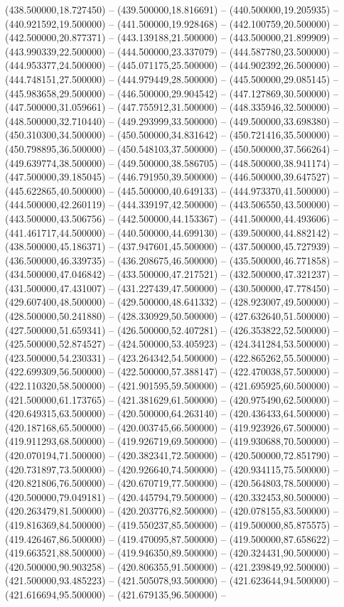 (438.500000,18.727450) -- (439.500000,18.816691) -- (440.500000,19.205935) -- (440.921592,19.500000) -- (441.500000,19.928468) -- (442.100759,20.500000) -- (442.500000,20.877371) -- (443.139188,21.500000) -- (443.500000,21.899909) -- (443.990339,22.500000) -- (444.500000,23.337079) -- (444.587780,23.500000) -- (444.953377,24.500000) -- (445.071175,25.500000) -- (444.902392,26.500000) -- (444.748151,27.500000) -- (444.979449,28.500000) -- (445.500000,29.085145) -- (445.983658,29.500000) -- (446.500000,29.904542) -- (447.127869,30.500000) -- (447.500000,31.059661) -- (447.755912,31.500000) -- (448.335946,32.500000) -- (448.500000,32.710440) -- (449.293999,33.500000) -- (449.500000,33.698380) -- (450.310300,34.500000) -- (450.500000,34.831642) -- (450.721416,35.500000) -- (450.798895,36.500000) -- (450.548103,37.500000) -- (450.500000,37.566264) -- (449.639774,38.500000) -- (449.500000,38.586705) -- (448.500000,38.941174) -- (447.500000,39.185045) -- (446.791950,39.500000) -- (446.500000,39.647527) -- (445.622865,40.500000) -- (445.500000,40.649133) -- (444.973370,41.500000) -- (444.500000,42.260119) -- (444.339197,42.500000) -- (443.506550,43.500000) -- (443.500000,43.506756) -- (442.500000,44.153367) -- (441.500000,44.493606) -- (441.461717,44.500000) -- (440.500000,44.699130) -- (439.500000,44.882142) -- (438.500000,45.186371) -- (437.947601,45.500000) -- (437.500000,45.727939) -- (436.500000,46.339735) -- (436.208675,46.500000) -- (435.500000,46.771858) -- (434.500000,47.046842) -- (433.500000,47.217521) -- (432.500000,47.321237) -- (431.500000,47.431007) -- (431.227439,47.500000) -- (430.500000,47.778450) -- (429.607400,48.500000) -- (429.500000,48.641332) -- (428.923007,49.500000) -- (428.500000,50.241880) -- (428.330929,50.500000) -- (427.632640,51.500000) -- (427.500000,51.659341) -- (426.500000,52.407281) -- (426.353822,52.500000) -- (425.500000,52.874527) -- (424.500000,53.405923) -- (424.341284,53.500000) -- (423.500000,54.230331) -- (423.264342,54.500000) -- (422.865262,55.500000) -- (422.699309,56.500000) -- (422.500000,57.388147) -- (422.470038,57.500000) -- (422.110320,58.500000) -- (421.901595,59.500000) -- (421.695925,60.500000) -- (421.500000,61.173765) -- (421.381629,61.500000) -- (420.975490,62.500000) -- (420.649315,63.500000) -- (420.500000,64.263140) -- (420.436433,64.500000) -- (420.187168,65.500000) -- (420.003745,66.500000) -- (419.923926,67.500000) -- (419.911293,68.500000) -- (419.926719,69.500000) -- (419.930688,70.500000) -- (420.070194,71.500000) -- (420.382341,72.500000) -- (420.500000,72.851790) -- (420.731897,73.500000) -- (420.926640,74.500000) -- (420.934115,75.500000) -- (420.821806,76.500000) -- (420.670719,77.500000) -- (420.564803,78.500000) -- (420.500000,79.049181) -- (420.445794,79.500000) -- (420.332453,80.500000) -- (420.263479,81.500000) -- (420.203776,82.500000) -- (420.078155,83.500000) -- (419.816369,84.500000) -- (419.550237,85.500000) -- (419.500000,85.875575) -- (419.426467,86.500000) -- (419.470095,87.500000) -- (419.500000,87.658622) -- (419.663521,88.500000) -- (419.946350,89.500000) -- (420.324431,90.500000) -- (420.500000,90.903258) -- (420.806355,91.500000) -- (421.239849,92.500000) -- (421.500000,93.485223) -- (421.505078,93.500000) -- (421.623644,94.500000) -- (421.616694,95.500000) -- (421.679135,96.500000) -- 